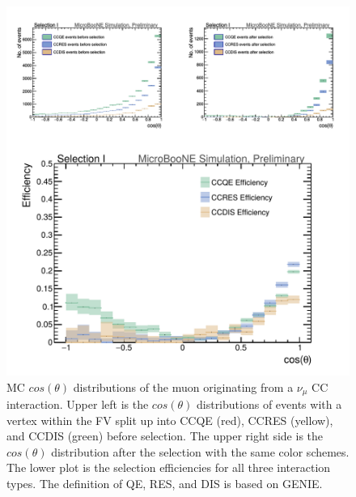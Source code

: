 \begin{figure}[htp!]
\includegraphics[width=\textwidth]{figs/truth_stackedmucostheta.png}
\caption{MC $cos(\theta)$ distributions of the muon originating from a $\nu_{\mu}$ CC interaction. Upper left is the $cos(\theta)$ distributions of events with a vertex within the FV split up into CCQE (red), CCRES (yellow), and CCDIS (green) before selection. The upper right side is the $cos(\theta)$ distribution after the selection with the same color schemes. The lower plot is the selection efficiencies for all three interaction types. The definition of QE, RES, and DIS is based on GENIE.}
\label{fig:stacked1}
\end{figure}

